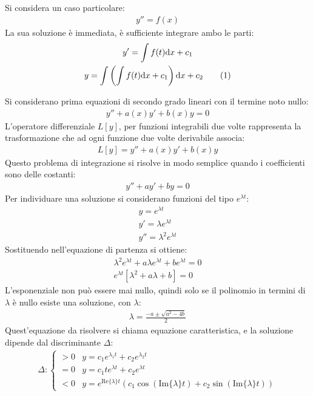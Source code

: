 \documentclass{article}
\newcommand{\df}{\mathrm{d}}
\numberwithin{equation}{subsection}
\newcommand{\tageq}{\tag{\stepcounter{equation}\theequation}}
\begin{document}
Si considera un caso particolare:
\begin{gather}
    y''=f(x)
\end{gather}
La sua soluzione è immediata, è sufficiente integrare ambo le parti:
\begin{gather*}
    y'=\displaystyle\int f(t)\df x+c_1\\
    y=\displaystyle\int\left(\int f(t)\df x+c_1\right) \df x+c_2\tageq
\end{gather*}


Si considerano prima equazioni di secondo grado lineari con il termine noto nullo:
\begin{gather*}
    y''+a(x)y'+b(x)y=0
\end{gather*}
L'operatore differenziale $L[y]$, per funzioni integrabili due volte rappresenta la trasformazione che ad ogni funzione due volte derivabile associa:
\begin{gather*}
    L[y]=y''+a(x)y'+b(x)y
\end{gather*}
Questo problema di integrazione si risolve in modo semplice quando i coefficienti sono delle costanti:
\begin{gather}
    y''+ay'+by=0
\end{gather}
Per individuare una soluzione si considerano funzioni del tipo $e^{\lambda t}$:
\begin{gather*}
    y=e^{\lambda t}\\
    y'=\lambda e^{\lambda t}\\
    y''=\lambda^2e^{\lambda t}
\end{gather*}
Sostituendo nell'equazione di partenza si ottiene:
\begin{gather*}
    \lambda^2e^{\lambda t}+a\lambda e^{\lambda t}+be^{\lambda t}=0\\
    e^{\lambda t}\left[\lambda^2+a\lambda+b\right]=0
\end{gather*}
L'esponenziale non può essere mai nullo, quindi solo se il polinomio in termini di $\lambda$ è nullo esiste una soluzione, con $\lambda$:
\begin{gather*}
    \lambda=\displaystyle\frac{-a\pm\sqrt{a^2-4b}}{2}
\end{gather*}
Quest'equazione da risolvere si chiama equazione caratteristica, e la soluzione dipende dal discriminante $\Delta$:
\begin{gather}
    \Delta:\begin{cases}
    >0&y=c_1e^{\lambda_1t}+c_2e^{\lambda_2t}\\
    =0&y=c_1te^{\lambda t}+c_2e^{\lambda t}\\
    <0&y=e^{\mathrm{Re}\{\lambda\}t}\left(c_1\cos(\mathrm{Im}\{\lambda\}t)+c_2\sin(\mathrm{Im}\{\lambda\}t)\right)
    \end{cases}    
\end{gather}
\end{document}
